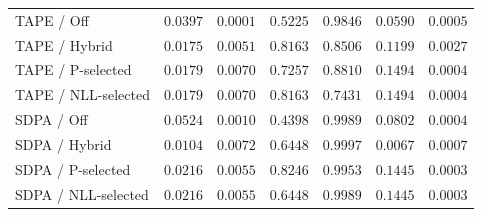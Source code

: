 \begin{table}[tb]
\begin{tabular}{l*{6}{r}}
\addlinespace[3pt]
TAPE / Off & $0.0397$ & $0.0001$ & $0.5225$ & $0.9846$ & $0.0590$ & $0.0005$ \\
TAPE / Hybrid & $0.0175$ & $0.0051$ & $0.8163$ & $0.8506$ & $0.1199$ & $0.0027$ \\
TAPE / P-selected & $0.0179$ & $0.0070$ & $0.7257$ & $0.8810$ & $0.1494$ & $0.0004$ \\
TAPE / NLL-selected & $0.0179$ & $0.0070$ & $0.8163$ & $0.7431$ & $0.1494$ & $0.0004$ \\
\addlinespace[3pt]
SDPA / Off & $0.0524$ & $0.0010$ & $0.4398$ & $0.9989$ & $0.0802$ & $0.0004$ \\
SDPA / Hybrid & $0.0104$ & $0.0072$ & $0.6448$ & $0.9997$ & $0.0067$ & $0.0007$ \\
SDPA / P-selected & $0.0216$ & $0.0055$ & $0.8246$ & $0.9953$ & $0.1445$ & $0.0003$ \\
SDPA / NLL-selected & $0.0216$ & $0.0055$ & $0.6448$ & $0.9989$ & $0.1445$ & $0.0003$ \\
\bottomrule
\end{tabular}
\end{table}
